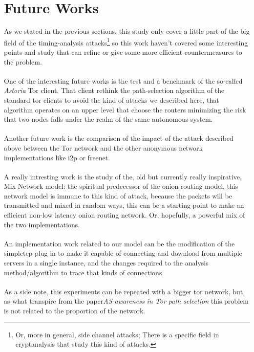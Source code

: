 \section{Future Works}
As we stated in the previous sections, this study only cover a little part of
the big field of the timing-analysis attacks\footnote{Or, more in general, side
channel attacks; There is a specific field in cryptanalysis that study this kind
of attacks.} so this work haven't covered some interesting points and study that
can refine or give some more efficient countermeasures to the problem.
\\\\
One of the interesting future works is the test and a benchmark
of the so-called \emph{Astoria}\cite{starov2015measuring} Tor client.
That client rethink
the path-selection algorithm of the standard tor clients to avoid the kind of
attacks we described here, that algorithm operates on an upper level that choose
the routers minimizing the risk that two nodes falls under the realm of the same
autonomous system.
\\\\
Another future work is the comparison of the impact of the attack described above
between the Tor network and the other anonymous network implementations like i2p or freenet.
\\\\
A really intresting work is the study of the, old but currently really inspirative,
Mix Network model\cite{chaum1981untraceable}: the spiritual predecessor
of the onion routing model, this network model is immune to this kind of
attack, because the packets will be transmitted and mixed in random ways,
this can be a starting point to make an efficient non-low latency onion routing
network. Or, hopefully, a powerful mix of the two implementations.
\\\\
An implementation work related to our model can be the modification
of the simpletcp plug-in to make it capable of connecting and download from
multiple servers in a single instance, and the changes
required to the analysis method/algorithm to trace that kinds of connections.
\\\\
As a side note, this experiments can be repeated with a bigger tor
network, but, as what transpire from the paper\emph{AS-awareness in Tor
path selection}\cite{edman2009awareness} this problem is not related to
the proportion of the network.
